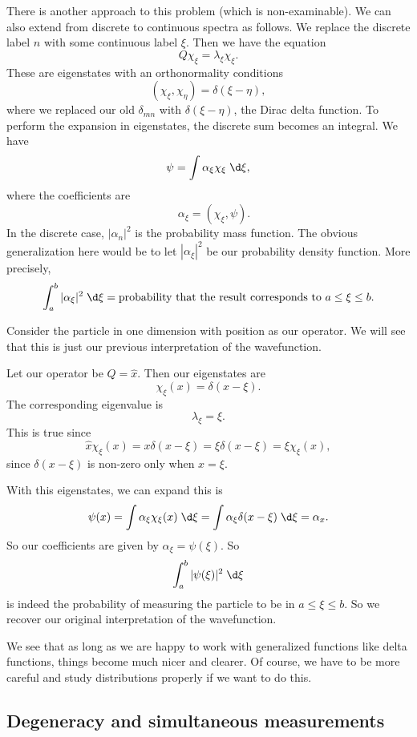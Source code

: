 \documentclass[a4paper]{article}
\begin{document}
There is another approach to this problem (which is non-examinable). We can also extend from discrete to continuous spectra as follows. We replace the discrete label $n$ with some continuous label $\xi$. Then we have the equation
\[
  Q \chi_\xi = \lambda_\xi \chi_\xi.
\]
These are eigenstates with an orthonormality conditions
\[
  (\chi_\xi, \chi_\eta) = \delta(\xi - \eta),
\]
where we replaced our old $\delta_{mn}$ with $\delta(\xi - \eta)$, the Dirac delta function. To perform the expansion in eigenstates, the discrete sum becomes an integral. We have
\[
  \psi = \int \alpha_\xi \chi_\xi \;\d \xi,
\]
where the coefficients are
\[
  \quad \alpha_\xi = (\chi_\xi, \psi).
\]
In the discrete case, $|\alpha_n|^2$ is the probability mass function. The obvious generalization here would be to let $|\alpha_\xi|^2$ be our probability density function. More precisely,
\[
  \int_a^b |\alpha_\xi|^2 \;\d \xi = \text{probability that the result corresponds to }a \leq \xi \leq b.
\]
\begin{eg}
  Consider the particle in one dimension with position as our operator. We will see that this is just our previous interpretation of the wavefunction.

  Let our operator be $Q = \hat{x}$. Then our eigenstates are
  \[
    \chi_\xi (x) = \delta(x - \xi).
  \]
  The corresponding eigenvalue is
  \[
    \lambda_\xi = \xi.
  \]
  This is true since
  \[
    \hat{x} \chi_\xi(x) = x \delta (x - \xi) = \xi \delta(x - \xi) = \xi \chi_\xi(x),
  \]
  since $\delta(x - \xi)$ is non-zero only when $x = \xi$.

  With this eigenstates, we can expand this is
  \[
    \psi(x) = \int \alpha_\xi \chi_\xi(x)\;\d \xi = \int \alpha_\xi \delta(x - \xi) \;\d \xi = \alpha_x.
  \]
  So our coefficients are given by $\alpha_\xi = \psi(\xi)$. So
  \[
    \int_a^b |\psi(\xi)|^2 \;\d \xi
  \]
  is indeed the probability of measuring the particle to be in $a \leq \xi \leq b$. So we recover our original interpretation of the wavefunction.
\end{eg}

We see that as long as we are happy to work with generalized functions like delta functions, things become much nicer and clearer. Of course, we have to be more careful and study distributions properly if we want to do this.

\subsection{Degeneracy and simultaneous measurements}
\end{document}
